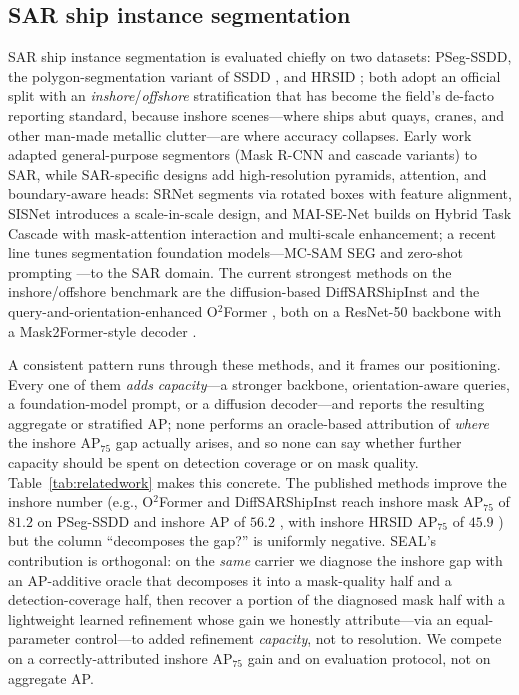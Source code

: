 \subsection{SAR ship instance segmentation}
SAR ship instance segmentation is evaluated chiefly on two datasets: PSeg-SSDD, the polygon-segmentation variant of SSDD \cite{zhang2021ssdd}, and HRSID \cite{wei2020hrsid}; both adopt an official split with an \emph{inshore}/\emph{offshore} stratification that has become the field's de-facto reporting standard, because inshore scenes---where ships abut quays, cranes, and other man-made metallic clutter---are where accuracy collapses. Early work adapted general-purpose segmentors (Mask R-CNN and cascade variants) to SAR, while SAR-specific designs add high-resolution pyramids, attention, and boundary-aware heads: SRNet \cite{yang2023srnet} segments via rotated boxes with feature alignment, SISNet \cite{shao2023scaleinscale} introduces a scale-in-scale design, and MAI-SE-Net \cite{zhang2022maisenet} builds on Hybrid Task Cascade with mask-attention interaction and multi-scale enhancement; a recent line tunes segmentation foundation models---MC-SAM SEG \cite{zheng2024mcsamseg} and zero-shot prompting \cite{mansour2026zeroshot}---to the SAR domain. The current strongest methods on the inshore/offshore benchmark are the diffusion-based DiffSARShipInst \cite{xu2025diffsarshipinst} and the query-and-orientation-enhanced O$^2$Former \cite{gao2025o2former}, both on a ResNet-50 backbone with a Mask2Former-style decoder \cite{cheng2022mask2former}.

A consistent pattern runs through these methods, and it frames our positioning. Every one of them \emph{adds capacity}---a stronger backbone, orientation-aware queries, a foundation-model prompt, or a diffusion decoder---and reports the resulting aggregate or stratified AP; none performs an oracle-based attribution of \emph{where} the inshore AP$_{75}$ gap actually arises, and so none can say whether further capacity should be spent on detection coverage or on mask quality. Table~\ref{tab:relatedwork} makes this concrete. The published methods improve the inshore number (e.g., O$^2$Former and DiffSARShipInst reach inshore mask AP$_{75}$ of $81.2$ on PSeg-SSDD \cite{gao2025o2former} and inshore AP of $56.2$ \cite{xu2025diffsarshipinst}, with inshore HRSID AP$_{75}$ of $45.9$ \cite{gao2025o2former}) but the column ``decomposes the gap?'' is uniformly negative. SEAL's contribution is orthogonal: on the \emph{same} carrier we diagnose the inshore gap with an AP-additive oracle that decomposes it into a mask-quality half and a detection-coverage half, then recover a portion of the diagnosed mask half with a lightweight learned refinement whose gain we honestly attribute---via an equal-parameter control---to added refinement \emph{capacity}, not to resolution. We compete on a correctly-attributed inshore AP$_{75}$ gain and on evaluation protocol, not on aggregate AP.

